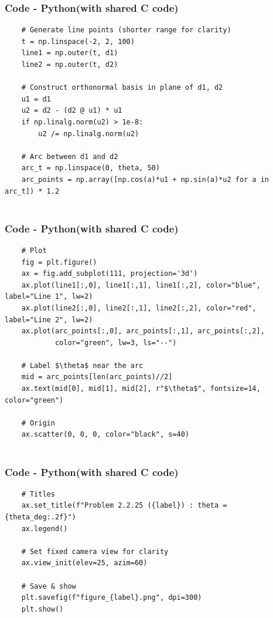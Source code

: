 \documentclass{beamer}
\theoremstyle{remark}
\numberwithin{equation}{section}
\begin{document}
\begin{frame}[fragile]
\frametitle{Code - Python(with shared C code)}
\begin{lstlisting}
    # Generate line points (shorter range for clarity)
    t = np.linspace(-2, 2, 100)
    line1 = np.outer(t, d1)
    line2 = np.outer(t, d2)
    
    # Construct orthonormal basis in plane of d1, d2
    u1 = d1
    u2 = d2 - (d2 @ u1) * u1
    if np.linalg.norm(u2) > 1e-8:
        u2 /= np.linalg.norm(u2)
    
    # Arc between d1 and d2
    arc_t = np.linspace(0, theta, 50)
    arc_points = np.array([np.cos(a)*u1 + np.sin(a)*u2 for a in arc_t]) * 1.2


\end{lstlisting}
\end{frame}

\begin{frame}[fragile]
\frametitle{Code - Python(with shared C code)}
\begin{lstlisting}
    # Plot
    fig = plt.figure()
    ax = fig.add_subplot(111, projection='3d')
    ax.plot(line1[:,0], line1[:,1], line1[:,2], color="blue", label="Line 1", lw=2)
    ax.plot(line2[:,0], line2[:,1], line2[:,2], color="red", label="Line 2", lw=2)
    ax.plot(arc_points[:,0], arc_points[:,1], arc_points[:,2],
            color="green", lw=3, ls="--")
    
    # Label $\theta$ near the arc
    mid = arc_points[len(arc_points)//2]
    ax.text(mid[0], mid[1], mid[2], r"$\theta$", fontsize=14, color="green")
    
    # Origin
    ax.scatter(0, 0, 0, color="black", s=40)


\end{lstlisting}
\end{frame}

\begin{frame}[fragile]
\frametitle{Code - Python(with shared C code)}
\begin{lstlisting}
    # Titles
    ax.set_title(f"Problem 2.2.25 ({label}) : theta = {theta_deg:.2f}")
    ax.legend()
    
    # Set fixed camera view for clarity
    ax.view_init(elev=25, azim=60)
    
    # Save & show
    plt.savefig(f"figure_{label}.png", dpi=300)
    plt.show()


\end{lstlisting}
\end{frame}
\end{document}
